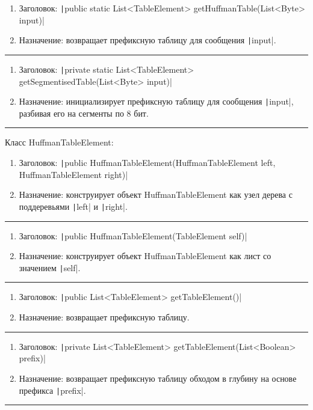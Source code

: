 \documentclass[a4paper,14pt]{extarticle}
\begin{document}
\begin{enumerate}
    \item Заголовок: \texttt|public static List<TableElement> getHuffmanTable(List<Byte> input)|
    \item Назначение: возвращает префиксную таблицу для сообщения \texttt|input|.
\end{enumerate}
\par\noindent\rule{\textwidth}{0.4pt}

\begin{enumerate}
    \item Заголовок: \texttt|private static List<TableElement> getSegmentisedTable(List<Byte> input)|
    \item Назначение: инициализирует префиксную таблицу для сообщения \texttt|input|, разбивая его на сегменты по 8 бит.
\end{enumerate}
\par\noindent\rule{\textwidth}{0.4pt}

Класс HuffmanTableElement:\\
\begin{enumerate}
    \item Заголовок: \texttt|public HuffmanTableElement(HuffmanTableElement left, HuffmanTableElement right)|
    \item Назначение: конструирует объект HuffmanTableElement как узел дерева с поддеревьями \texttt|left| и \texttt|right|.
\end{enumerate}
\par\noindent\rule{\textwidth}{0.4pt}
\begin{enumerate}
    \item Заголовок: \texttt|public HuffmanTableElement(TableElement self)|
    \item Назначение: конструирует объект HuffmanTableElement как лист со значением \texttt|self|.
\end{enumerate}
\par\noindent\rule{\textwidth}{0.4pt}
\begin{enumerate}
    \item Заголовок: \texttt|public List<TableElement> getTableElement()|
    \item Назначение: возвращает префиксную таблицу.
\end{enumerate}
\par\noindent\rule{\textwidth}{0.4pt}
\begin{enumerate}
    \item Заголовок: \texttt|private List<TableElement> getTableElement(List<Boolean> prefix)|
    \item Назначение: возвращает префиксную таблицу обходом в глубину на основе префикса \texttt|prefix|.
\end{enumerate}
\par\noindent\rule{\textwidth}{0.4pt}
\end{document}
